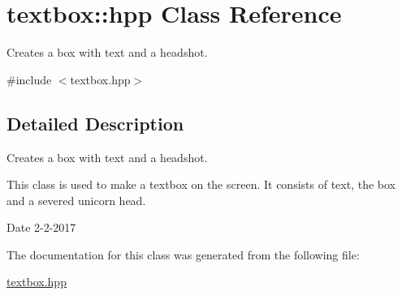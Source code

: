 \hypertarget{classtextbox_1_1hpp}{}\section{textbox\+:\+:hpp Class Reference}
\label{classtextbox_1_1hpp}


Creates a box with text and a headshot.  




{\ttfamily \#include $<$textbox.\+hpp$>$}



\subsection{Detailed Description}
Creates a box with text and a headshot. 

This class is used to make a textbox on the screen. It consists of text, the box and a severed unicorn head.

\begin{DoxyDate}{Date}
2-\/2-\/2017 
\end{DoxyDate}


The documentation for this class was generated from the following file\+:\begin{DoxyCompactItemize}
\item 
\hyperlink{textbox_8hpp}{textbox.\+hpp}\end{DoxyCompactItemize}
